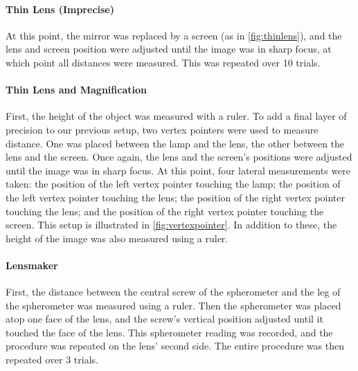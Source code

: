 
\paragraph{Thin Lens (Imprecise)}
At this point, the mirror was replaced by a screen (as in \cref{fig:thinlens}), and the lens and screen position were adjusted until the image was in sharp focus, at which point all distances were measured. This was repeated over 10 trials.


\paragraph{Thin Lens and Magnification}
First, the height of the object was measured with a ruler. To add a final layer of precision to our previous setup, two vertex pointers were used to measure distance. One was placed between the lamp and the lens, the other between the lens and the screen. Once again, the lens and the screen's positions were adjusted until the image was in sharp focus. At this point, four lateral measurements were taken: the position of the left vertex pointer touching the lamp; the position of the left vertex pointer touching the lens; the position of the right vertex pointer touching the lens; and the position of the right vertex pointer touching the screen. This setup is illustrated in \cref{fig:vertexpointer}. In addition to these, the height of the image was also measured using a ruler.


\paragraph{Lensmaker}
First, the distance between the central screw of the spherometer and the leg of the spherometer was measured using a ruler. Then the spherometer was placed atop one face of the lens, and the screw's vertical position adjusted until it touched the face of the lens. This spherometer reading was recorded, and the procedure was repeated on the lens' second side. The entire procedure was then repeated over 3 trials.